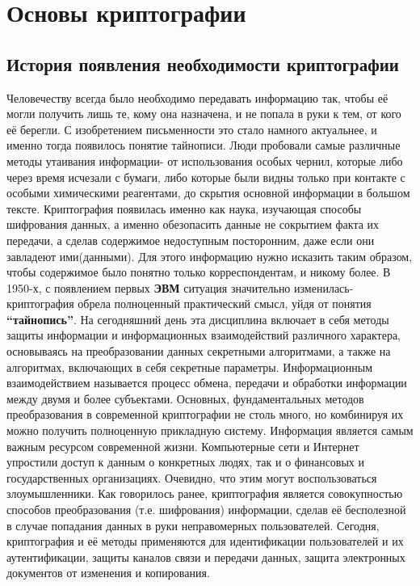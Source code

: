 \documentclass[a4paper,14pt]{report}
\begin{document}
\tableofcontents{}

\chapter{Основы криптографии}
\section{История появления необходимости криптографии}

Человечеству всегда было необходимо передавать информацию так, чтобы её могли получить лишь те, кому она назначена, и не попала в руки к тем, от кого её берегли. С изобретением письменности это стало намного актуальнее, и именно тогда появилось понятие тайнописи. Люди пробовали самые различные методы утаивания информации- от использования особых чернил, которые либо через время исчезали с бумаги, либо которые были видны только при контакте с особыми химическими реагентами, до скрытия основной информации в большом тексте.
Криптография появилась именно как наука, изучающая способы шифрования данных, а именно обезопасить данные не сокрытием факта их передачи, а сделав содержимое недоступным посторонним, даже если они завладеют ими(данными). Для этого информацию нужно исказить таким образом, чтобы содержимое было понятно только корреспондентам, и никому более.
В 1950-х, с появлением первых \textbf{ЭВМ} ситуация значительно изменилась- криптография обрела полноценный практический смысл, уйдя от понятия \textbf{“тайнопись”}. На сегодняшний день эта дисциплина включает в себя методы защиты информации и информационных взаимодействий различного характера, основываясь на преобразовании данных секретными алгоритмами, а также на алгоритмах, включающих в себя секретные параметры. Информационным взаимодействием называется процесс обмена, передачи и обработки информации между двумя и более субъектами. Основных, фундаментальных методов преобразования в современной криптографии не столь много, но комбинируя их можно получить полноценную прикладную систему.
Информация является самым важным ресурсом современной жизни. Компьютерные сети и Интернет упростили доступ к данным о конкретных людях, так и о финансовых и государственных организациях. Очевидно, что этим могут воспользоваться злоумышленники. Как говорилось ранее, криптография является совокупностью способов преобразования (т.е. шифрования)  информации, сделав её бесполезной в случае попадания данных в руки неправомерных пользователей.
Сегодня, криптография и её методы применяются для идентификации пользователей и их аутентификации,  защиты каналов связи и передачи данных, защита электронных документов от изменения и копирования.
\end{document}
